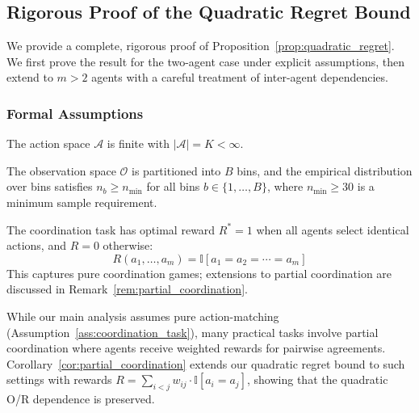 
\subsection{Rigorous Proof of the Quadratic Regret Bound}
\label{app:quadratic_proof}

We provide a complete, rigorous proof of Proposition~\ref{prop:quadratic_regret}. We first prove the result for the two-agent case under explicit assumptions, then extend to $m > 2$ agents with a careful treatment of inter-agent dependencies.

\subsubsection{Formal Assumptions}

\begin{assumption}
\label{ass:discrete_actions}
The action space $\mathcal{A}$ is finite with $|\mathcal{A}| = K < \infty$.
\end{assumption}

\begin{assumption}
\label{ass:observation_coverage}
The observation space $\mathcal{O}$ is partitioned into $B$ bins, and the empirical distribution over bins satisfies $n_b \geq n_{\min}$ for all bins $b \in \{1, \ldots, B\}$, where $n_{\min} \geq 30$ is a minimum sample requirement.
\end{assumption}

\begin{assumption}
\label{ass:coordination_task}
The coordination task has optimal reward $R^* = 1$ when all agents select identical actions, and $R = 0$ otherwise:
\begin{equation}
R(a_1, \ldots, a_m) = \mathbb{I}[a_1 = a_2 = \cdots = a_m]
\end{equation}
This captures pure coordination games; extensions to partial coordination are discussed in Remark~\ref{rem:partial_coordination}.
\end{assumption}

\begin{remark}
\label{rem:partial_coordination}
While our main analysis assumes pure action-matching (Assumption~\ref{ass:coordination_task}), many practical tasks involve partial coordination where agents receive weighted rewards for pairwise agreements. Corollary~\ref{cor:partial_coordination} extends our quadratic regret bound to such settings with rewards $R = \sum_{i<j} w_{ij} \cdot \mathbb{I}[a_i = a_j]$, showing that the quadratic O/R dependence is preserved.
\end{remark}


